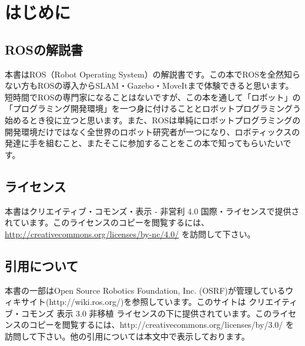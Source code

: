 \chapter*{はじめに}

\section*{ROSの解説書}

本書はROS（Robot Operating System）の解説書です。この本でROSを全然知らない方もROSの導入からSLAM・Gazebo・MoveItまで体験できると思います。短時間でROSの専門家になることはないですが、この本を通して「ロボット」の「プログラミング開発環境」を一つ身に付けることとロボットプログラミングう始めるとき役に立つと思います。また、ROSは単純にロボットプログラミングの開発環境だけではなく全世界のロボット研究者が一つになり、ロボティックスの発達に手を組むこと、またそこに参加することをこの本で知ってもらいたいです。


\section*{ライセンス}

本書はクリエイティブ・コモンズ・表示 - 非営利 4.0 国際・ライセンスで提供されています。このライセンスのコピーを閲覧するには、 \url{http://creativecommons.org/licenses/by-nc/4.0/} を訪問して下さい。\\

\section*{引用について}

本書の一部はOpen Source Robotics Foundation, Inc. (OSRF)が管理しているウィキサイト(http://wiki.ros.org/)を参照しています。このサイトは クリエイティブ・コモンズ 表示 3.0 非移植 ライセンスの下に提供されています。このライセンスのコピーを閲覧するには、http://creativecommons.org/licenses/by/3.0/ を訪問して下さい。他の引用については本文中で表示しております。

